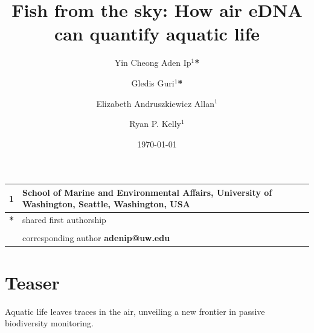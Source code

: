 \documentclass{article}
\title{Fish from the sky: How air eDNA can quantify aquatic life}
\author{Yin Cheong Aden Ip$^1$\textbf{*} \and
Gledis Guri$^1$\textbf{*} \and
Elizabeth Andruszkiewicz Allan$^1$ \and
Ryan P. Kelly$^1$}
\date{\today}
\begin{document}
\maketitle

\section*{}

\begin{center}
\begin{tabular}{ll}
1 & School of Marine and Environmental Affairs, University of Washington, Seattle, Washington, USA \\
\hline
\textbf{*} & shared first authorship\\
&\\
& corresponding author \textbf{adenip@uw.edu}
\end{tabular}
\end{center}

\section*{Teaser}
Aquatic life leaves traces in the air, unveiling a new frontier in passive biodiversity monitoring.
\end{document}
